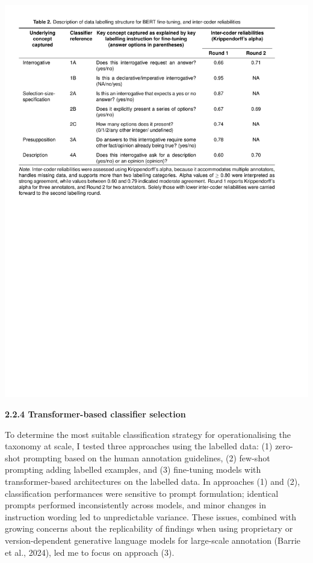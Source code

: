 \documentclass[
  12pt,
]{article}
\begin{document}
\begin{center}\includegraphics{../03_outputs/01_taxonomies_of_interrogatives/table_2} \end{center}

\textbf{2.2.4 Transformer-based classifier selection}

To determine the most suitable classification strategy for operationalising the taxonomy at scale, I tested three approaches using the labelled data: (1) zero-shot prompting based on the human annotation guidelines, (2) few-shot prompting adding labelled examples, and (3) fine-tuning models with transformer-based architectures on the labelled data. In approaches (1) and (2), classification performances were sensitive to prompt formulation; identical prompts performed inconsistently across models, and minor changes in instruction wording led to unpredictable variance. These issues, combined with growing concerns about the replicability of findings when using proprietary or version-dependent generative language models for large-scale annotation (Barrie et al., 2024), led me to focus on approach (3).
\end{document}
